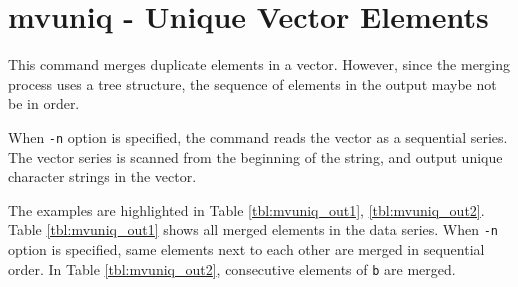 
%

\section{mvuniq - Unique Vector Elements\label{sect:mvuniq}}

This command merges duplicate elements in a vector. However, since the merging process uses a tree structure, the sequence of elements in the output maybe not be in order. 

When \verb|-n| option is specified, the command reads the vector as a sequential series. The vector series is scanned from the beginning of the string, and output unique character strings in the vector. 

The examples are highlighted in Table \ref{tbl:mvuniq_out1}, \ref{tbl:mvuniq_out2}.
Table \ref{tbl:mvuniq_out1} shows all merged elements in the data series. When \verb|-n| option is specified,  same elements next to each other are merged in sequential order. In Table \ref{tbl:mvuniq_out2}, consecutive elements of \verb|b| are merged. 

